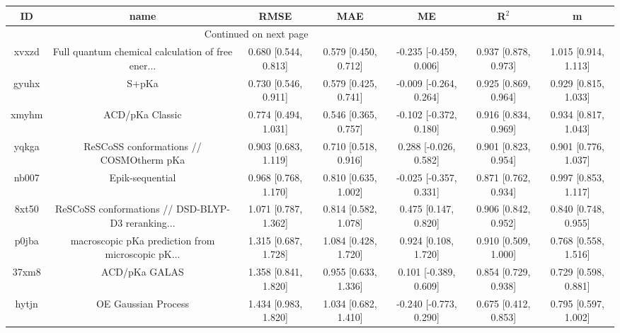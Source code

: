 \documentclass{article}
\begin{document}
\begin{center}
\begin{longtable}{|ccccccc|}
\toprule
    ID &                                               name &                  RMSE &                   MAE &                       ME &                 R$^2$ &                      m \\
\midrule
\endhead
\midrule
\multicolumn{3}{r}{{Continued on next page}} \\
\midrule
\endfoot

\bottomrule
\endlastfoot
 xvxzd &  Full quantum chemical calculation of free ener... &  0.680 [0.544, 0.813] &  0.579 [0.450, 0.712] &   -0.235 [-0.459, 0.006] &  0.937 [0.878, 0.973] &   1.015 [0.914, 1.113] \\
 gyuhx &                                              S+pKa &  0.730 [0.546, 0.911] &  0.579 [0.425, 0.741] &   -0.009 [-0.264, 0.264] &  0.925 [0.869, 0.964] &   0.929 [0.815, 1.033] \\
 xmyhm &                                    ACD/pKa Classic &  0.774 [0.494, 1.031] &  0.546 [0.365, 0.757] &   -0.102 [-0.372, 0.180] &  0.916 [0.834, 0.969] &   0.934 [0.817, 1.043] \\
 yqkga &            ReSCoSS conformations // COSMOtherm pKa &  0.903 [0.683, 1.119] &  0.710 [0.518, 0.916] &    0.288 [-0.026, 0.582] &  0.901 [0.823, 0.954] &   0.901 [0.776, 1.037] \\
 nb007 &                                    Epik-sequential &  0.968 [0.768, 1.170] &  0.810 [0.635, 1.002] &   -0.025 [-0.357, 0.331] &  0.871 [0.762, 0.934] &   0.997 [0.853, 1.117] \\
 8xt50 &  ReSCoSS conformations // DSD-BLYP-D3 reranking... &  1.071 [0.787, 1.362] &  0.814 [0.582, 1.078] &     0.475 [0.147, 0.820] &  0.906 [0.842, 0.952] &   0.840 [0.748, 0.955] \\
 p0jba &  macroscopic pKa prediction from microscopic pK... &  1.315 [0.687, 1.728] &  1.084 [0.428, 1.720] &     0.924 [0.108, 1.720] &  0.910 [0.509, 1.000] &   0.768 [0.558, 1.516] \\
 37xm8 &                                      ACD/pKa GALAS &  1.358 [0.841, 1.820] &  0.955 [0.633, 1.336] &    0.101 [-0.389, 0.609] &  0.854 [0.729, 0.938] &   0.729 [0.598, 0.881] \\
 hytjn &                                OE Gaussian Process &  1.434 [0.983, 1.820] &  1.034 [0.682, 1.410] &   -0.240 [-0.773, 0.290] &  0.675 [0.412, 0.853] &   0.795 [0.597, 1.002] \\

\end{longtable}
\end{center}
\end{document}
